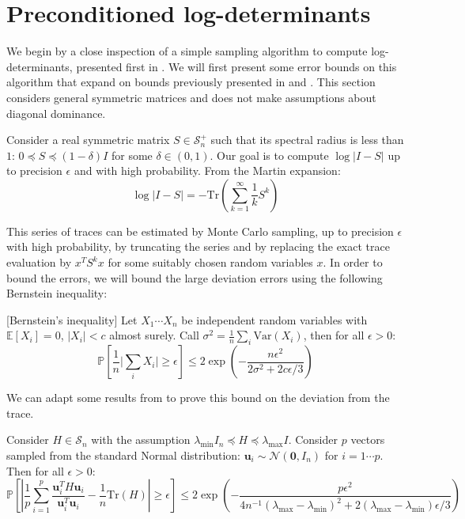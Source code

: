 
\section{Preconditioned log-determinants\label{sec:Preconditioned-log-determinants}}

We begin by a close inspection of a simple sampling algorithm to compute
log-determinants, presented first in \cite{Barry1999}. We will first
present some error bounds on this algorithm that expand on bounds
previously presented in \cite{Bai1996} and \cite{Barry1999}. This
section considers general symmetric matrices and does not make assumptions
about diagonal dominance.

Consider a real symmetric matrix $S\in\mathcal{S}_{n}^{+}$ such that
its spectral radius is less than $1$: $0\preceq S\preceq\left(1-\delta\right)I$
for some $\delta\in\left(0,1\right)$. Our goal is to compute $\log\left|I-S\right|$
up to precision $\epsilon$ and with high probability. From the Martin
expansion: 
\begin{equation}
\log\left|I-S\right|=-\mbox{Tr}\left(\sum_{k=1}^{\infty}\frac{1}{k}S^{k}\right)\label{eq:martin}
\end{equation}


This series of traces can be estimated by Monte Carlo sampling, up
to precision $\epsilon$ with high probability, by truncating the
series and by replacing the exact trace evaluation by $x^{T}S^{k}x$
for some suitably chosen random variables $x$. In order to bound
the errors, we will bound the large deviation errors using the following
Bernstein inequality:

\begin{lemma}{[}Bernstein's inequality{]} \label{lem:bernstein}
Let $X_{1}\cdots X_{n}$ be independent random variables with $\mathbb{E}\left[X_{i}\right]=0$,
$\left|X_{i}\right|<c$ almost surely. Call $\sigma^{2}=\frac{1}{n}\sum_{i}\text{Var}\left(X_{i}\right)$,
then for all $\epsilon>0$: 
\[
\mathbb{P}\left[\frac{1}{n}\Big|\sum_{i}X_{i}\Big|\geq\epsilon\right]\leq2\exp\left(-\frac{n\epsilon^{2}}{2\sigma^{2}+2c\epsilon/3}\right)
\]
\end{lemma}

We can adapt some results from \cite{Barry1999} to prove this bound
on the deviation from the trace.

\begin{lemma} \label{lem:bernstein-trace}Consider $H\in\mathcal{S}_{n}$
with the assumption $\lambda_{\text{min}}I_{n}\preceq H\preceq\lambda_{\text{max}}I$.
Consider $p$ vectors sampled from the standard Normal distribution:
$\mathbf{u}_{i}\sim\mathcal{N}\left(\mathbf{0},I_{n}\right)$ for
$i=1\cdots p$. Then for all $\epsilon>0$: 
\[
\mathbb{P}\left[\left|\frac{1}{p}\sum_{i=1}^{p}\frac{\mathbf{u}_{i}^{T}H\mathbf{u}_{i}}{\mathbf{u}_{i}^{T}\mathbf{u}_{i}}-\frac{1}{n}\mbox{Tr}\left(H\right)\right|\geq\epsilon\right]\leq2\exp\left(-\frac{p\epsilon^{2}}{4n^{-1}\left(\lambda_{\max}-\lambda_{\min}\right)^{2}+2\left(\lambda_{\max}-\lambda_{\min}\right)\epsilon/3}\right)
\]
\end{lemma}

